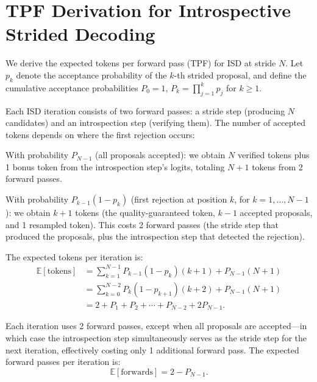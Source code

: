 \appendix

\section{TPF Derivation for Introspective Strided Decoding}
\label{app:tpf_derivation}

We derive the expected tokens per forward pass (TPF) for ISD at stride $N$. Let $p_k$ denote the acceptance probability of the $k$-th strided proposal, and define the cumulative acceptance probabilities $P_0 = 1$, $P_k = \prod_{j=1}^{k} p_j$ for $k \geq 1$.

Each ISD iteration consists of two forward passes: a stride step (producing $N$ candidates) and an introspection step (verifying them). The number of accepted tokens depends on where the first rejection occurs:

\begin{denseitemize}
    \item With probability $P_{N-1}$ (all proposals accepted): we obtain $N$ verified tokens plus 1 bonus token from the introspection step's logits, totaling $N + 1$ tokens from 2 forward passes.
    \item With probability $P_{k-1}(1 - p_k)$ (first rejection at position $k$, for $k = 1, \ldots, N{-}1$): we obtain $k + 1$ tokens (the quality-guaranteed token, $k{-}1$ accepted proposals, and 1 resampled token). This costs 2 forward passes (the stride step that produced the proposals, plus the introspection step that detected the rejection).
\end{denseitemize}

The expected tokens per iteration is:
\begin{align}
    \mathbb{E}[\text{tokens}] &= \sum_{k=1}^{N-1} P_{k-1}(1 - p_k)(k + 1) + P_{N-1}(N + 1) \nonumber \\
    &= \sum_{k=0}^{N-2} P_k(1 - p_{k+1})(k + 2) + P_{N-1}(N + 1) \nonumber \\
    &= 2 + P_1 + P_2 + \cdots + P_{N-2} + 2P_{N-1}.
\end{align}

Each iteration uses 2 forward passes, except when all proposals are accepted---in which case the introspection step simultaneously serves as the stride step for the next iteration, effectively costing only 1 additional forward pass. The expected forward passes per iteration is:
\begin{equation}
    \mathbb{E}[\text{forwards}] = 2 - P_{N-1}.
\end{equation}

